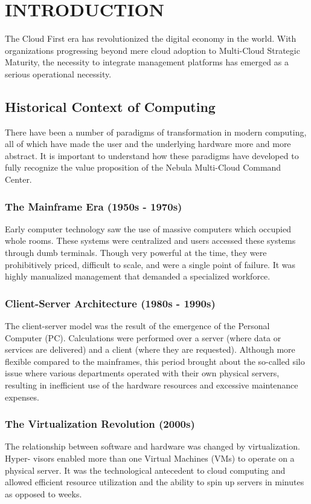 \chapter{INTRODUCTION}

The Cloud First era has revolutionized the digital economy in the world. With organizations progressing beyond mere cloud adoption to Multi-Cloud Strategic Maturity, the necessity to integrate management platforms has emerged as a serious operational necessity.

\section{Historical Context of Computing}
There have been a number of paradigms of transformation in modern computing, all of which have made the user and the underlying hardware more and more abstract. It is important to understand how these paradigms have developed to fully recognize the value proposition of the Nebula Multi-Cloud Command Center.

\subsection{The Mainframe Era (1950s - 1970s)}
Early computer technology saw the use of massive computers which occupied whole rooms. These systems were centralized and users accessed these systems through dumb terminals. Though very powerful at the time, they were prohibitively priced, difficult to scale, and were a single point of failure. It was highly manualized management that demanded a specialized workforce.

\subsection{Client-Server Architecture (1980s - 1990s)}
The client-server model was the result of the emergence of the Personal Computer (PC). Calculations were performed over a server (where data or services are delivered) and a client (where they are requested). Although more flexible compared to the mainframes, this period brought about the so-called silo issue where various departments operated with their own physical servers, resulting in inefficient use of the hardware resources and excessive maintenance expenses.

\subsection{The Virtualization Revolution (2000s)}
The relationship between software and hardware was changed by virtualization. Hyper- visors enabled more than one Virtual Machines (VMs) to operate on a physical server. It was the technological antecedent to cloud computing and allowed efficient resource utilization and the ability to spin up servers in minutes as opposed to weeks.

